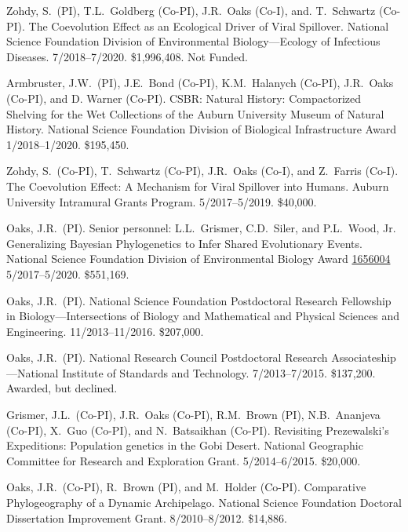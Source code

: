 \myHangIndent
Zohdy, S.\ (PI),
T.L.\ Goldberg (Co-PI),
J.R.\ Oaks (Co-I), and.
T.\ Schwartz (Co-PI).
The Coevolution Effect as an Ecological Driver of Viral Spillover.
National Science Foundation Division of Environmental Biology---Ecology of Infectious Diseases.
7/2018--7/2020.
\$1,996,408.
Not Funded.

\myHangIndent
Armbruster, J.W.\ (PI),
J.E.\ Bond (Co-PI),
K.M.\ Halanych (Co-PI),
J.R.\ Oaks (Co-PI),
and
D. Warner (Co-PI).
CSBR: Natural History: Compactorized Shelving for the Wet Collections of the
Auburn University Museum of Natural History.
National Science Foundation Division of Biological Infrastructure Award
1/2018--1/2020.
\$195,450.

\myHangIndent
Zohdy, S.\ (Co-PI), T.\ Schwartz (Co-PI), J.R.\ Oaks (Co-I), and Z.\ Farris (Co-I).
The Coevolution Effect: A Mechanism for Viral Spillover into Humans.
Auburn University Intramural Grants Program.
5/2017--5/2019.
\$40,000.

\myHangIndent
Oaks, J.R.\ (PI).
Senior personnel: L.L.\ Grismer, C.D.\ Siler, and P.L.\ Wood, Jr.
Generalizing Bayesian Phylogenetics to Infer Shared Evolutionary Events.
National Science Foundation Division of Environmental Biology Award
\href{https://www.nsf.gov/awardsearch/showAward?AWD_ID=1656004&HistoricalAwards=false}{1656004}
5/2017--5/2020.
\$551,169.

\myHangIndent
Oaks, J.R.\ (PI).
National Science Foundation Postdoctoral Research Fellowship in
Biology---Intersections of Biology and Mathematical and Physical Sciences and
Engineering.
11/2013--11/2016.
\$207,000.

\myHangIndent
Oaks, J.R.\ (PI).
National Research Council Postdoctoral Research Associateship---National
Institute of Standards and Technology.
7/2013--7/2015.
\$137,200.
Awarded, but declined.

\myHangIndent
Grismer, J.L.\ (Co-PI), J.R.\ Oaks (Co-PI), R.M.\ Brown (PI), N.B.\ Ananjeva
(Co-PI), X.\ Guo (Co-PI), and N.\ Batsaikhan (Co-PI).
Revisiting Prezewalski's Expeditions: Population genetics in the Gobi Desert.
National Geographic Committee for Research and Exploration Grant.
5/2014--6/2015.
\$20,000.

\myHangIndent
Oaks, J.R.\ (Co-PI), R.\ Brown (PI), and M.\ Holder (Co-PI).
Comparative Phylogeography of a Dynamic Archipelago.
National Science Foundation Doctoral Dissertation Improvement Grant.
8/2010--8/2012.
\$14,886.
